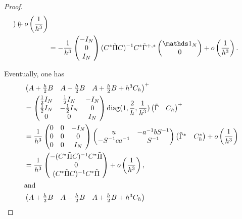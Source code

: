 \begin{proof}
\begin{align*}
\begin{pmatrix}
\end{pmatrix}+o\left(\frac{1}{h^3}\right) \\
&= -\frac{1}{h^3}\begin{pmatrix} -I_N\\0\\I_N\end{pmatrix} (C^*\tilde{\Pi} C)^{-1}C^*\tilde{\Gamma}^{+,*} \begin{pmatrix} \bun_N\\0\end{pmatrix} +o\left(\frac{1}{h^3}\right).
\end{align*}

Eventually, one has 
\begin{align*}
  &\begin{pmatrix}
 A+\frac{h}{2}B & A-\frac{h}{2}B & A+\frac{h}{2}B+ h^3 C_h
\end{pmatrix}^+\\
&=\begin{pmatrix}\frac{1}{2} I_N & \frac{1}{2} I_N & -I_N\\ \frac{1}{2}I_N &-\frac{1}{2} I_N & 0\\ 0 & 0 &I_N  \end{pmatrix}
  \operatorname{diag}(1,\frac{2}{h},\frac{1}{h^3})
\begin{pmatrix}
  \tilde{\Gamma} & C_h
\end{pmatrix}^+ \\
&=\frac{1}{h^3} \begin{pmatrix}0 & 0 & -I_N\\ 0&0& 0\\ 0 & 0 &I_N  \end{pmatrix}\begin{pmatrix}
    u & -a^{-1}bS^{-1}\\
    -S^{-1}ca^{-1} & S^{-1}\end{pmatrix} \begin{pmatrix} \tilde{\Gamma}^*& C_h^*\end{pmatrix}+o\left(\frac{1}{h^3}\right)\\
  &= \frac{1}{h^3}  \begin{pmatrix}
    -(C^*\tilde{\Pi} C)^{-1}C^*\tilde{\Pi} \\ 0 \\ (C^*\tilde{\Pi} C)^{-1}C^*\tilde{\Pi} 
    \end{pmatrix}+ o\left(\frac{1}{h^3}\right),\\
    \intertext{and }
&\begin{pmatrix}
 A+\frac{h}{2}B & A-\frac{h}{2}B & A+\frac{h}{2}B+ h^3 C_h

\end{pmatrix}
\end{align*}
\end{proof}
